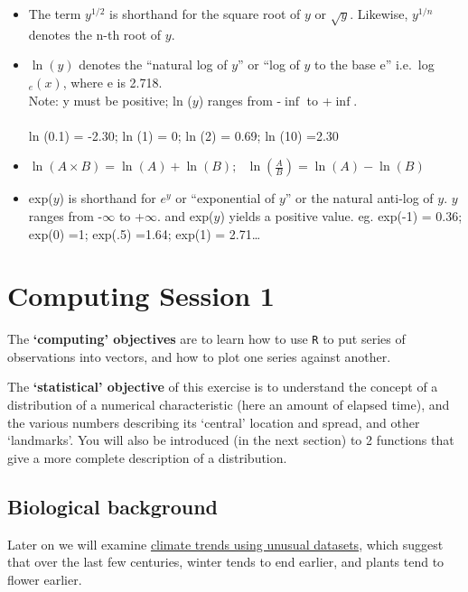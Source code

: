 \documentclass[]{book}
\begin{document}
\begin{itemize}
\item
  The term \(y^{1/2}\) is shorthand for the square root of \(y\) or \(\sqrt{y}\). Likewise, \(y^{1/n}\) denotes the n-th root of \(y\).
\item
  \(\ln (y)\) denotes the ``natural log of \(y\)'' or ``log of \(y\) to
  the base e'' i.e.~log\(_e(x)\), where e is 2.718.\\
  Note: y must be positive; ln (\(y\)) ranges from -\(\inf\) to +\(\inf\).\\
  \hspace*{0.333em}\\
  ln (0.1) = -2.30; ln (1) = 0; ln (2) = 0.69; ln (10) =2.30
\item
  \(\ln(A \times B) = \ln(A) + \ln(B); \ \ \ \ln(\frac{A}{B}) = \ln(A) - \ln(B)\)
\item
  exp(\(y\)) is shorthand for \(e^y\) or ``exponential of \(y\)'' or the natural anti-log of \(y\). \(y\) ranges from -\(\infty\) to +\(\infty\). and exp(\(y\)) yields a positive value. eg. exp(-1) = 0.36; exp(0) =1; exp(.5) =1.64; exp(1) = 2.71\ldots{}
\end{itemize}

\hypertarget{computing01}{%
\chapter{Computing Session 1}\label{computing01}}

The \textbf{`computing' objectives} are to learn how to use \texttt{R} to put series of observations into vectors, and how to plot one series against another.

The \textbf{`statistical' objective} of this exercise is to understand the concept of a distribution of a numerical characteristic (here an amount of elapsed time), and the various numbers describing its `central' location and spread, and other `landmarks'. You will also be introduced (in the next section) to 2 functions that give a more complete description of a distribution.

\hypertarget{biological-background}{%
\section{Biological background}\label{biological-background}}

Later on we will examine \href{http://www.medicine.mcgill.ca/epidemiology/hanley/c678/index.html\#anthropometricData}{climate trends using unusual datasets}, which suggest that over the last few centuries, winter tends to end earlier, and plants tend to flower earlier.
\end{document}
